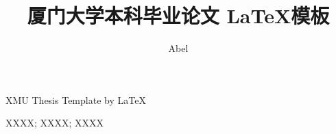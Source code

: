 \documentclass{xmu}
\begin{document}
\print

\arabicchapter




\title{厦门大学本科毕业论文 \LaTeX 模板}
{XMU Thesis Template by \LaTeX}

\author{Abel}



\subject{XXXX}





{XXXX; XXXX; XXXX}


\maketitle


\begin{acknowledgement}
\end{acknowledgement}


\begin{abstract}
\end{abstract}

\begin{enabstract}
\end{enabstract}


\tableofcontents





\end{document}
